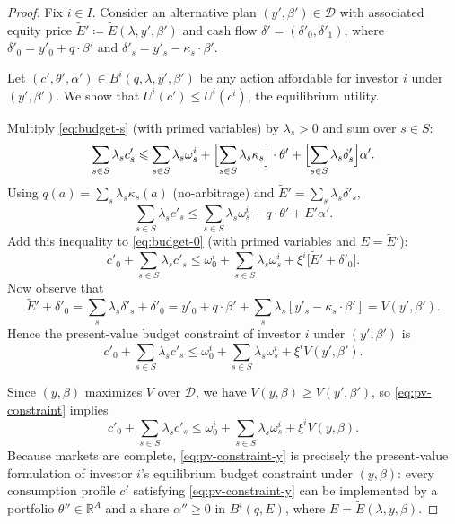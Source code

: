 \documentclass[11pt,a4paper,oneside]{book}
\def\R{\mathbb{R}}
\def\leq{\leqslant}
\def\geq{\geqslant}
\theoremstyle{plain}
\theoremstyle{definition}
\theoremstyle{remark}
\numberwithin{equation}{chapter}
\begin{document}
\begin{proof}
Fix $i \in I$.
Consider an alternative plan $(y', \beta') \in \mathcal{D}$ with associated equity price $\widetilde{E}' \coloneqq \widetilde{E}(\lambda, y', \beta')$ and cash flow $\delta' = (\delta'_0, \delta'_1)$, where $\delta'_0 = y'_0 + q \cdot \beta'$ and $\delta'_s = y'_s - \kappa_s \cdot \beta'$.

Let $(c', \theta', \alpha') \in B^i(q, \lambda, y', \beta')$ be any action affordable for investor $i$ under $(y', \beta')$.
We show that $U^i(c') \leq U^i(c^i)$, the equilibrium utility.

Multiply \eqref{eq:budget-s} (with primed variables) by $\lambda_s > 0$ and sum over $s \in S$:
\begin{equation*}
  \sum_{s \in S} \lambda_s c'_s
  \leq
  \sum_{s \in S} \lambda_s \omega^i_s
  + \Bigl[ \sum_{s \in S} \lambda_s \kappa_s \Bigr] \cdot \theta'
  + \Bigl[ \sum_{s \in S} \lambda_s \delta'_s \Bigr] \alpha'.
\end{equation*}
Using $q(a) = \sum_s \lambda_s \kappa_s(a)$ (no-arbitrage) and $\widetilde{E}' = \sum_s \lambda_s \delta'_s$,
\begin{equation*}
  \sum_{s \in S} \lambda_s c'_s
  \leq
  \sum_{s \in S} \lambda_s \omega^i_s
  + q \cdot \theta'
  + \widetilde{E}' \alpha'.
\end{equation*}
Add this inequality to \eqref{eq:budget-0} (with primed variables and $E = \widetilde{E}'$):
\begin{equation*}
  c'_0 + \sum_{s \in S} \lambda_s c'_s
  \leq
  \omega^i_0 + \sum_{s \in S} \lambda_s \omega^i_s
  + \xi^i \bigl[ \widetilde{E}' + \delta'_0 \bigr].
\end{equation*}
Now observe that
\begin{equation*}
  \widetilde{E}' + \delta'_0
  = \sum_s \lambda_s \delta'_s + \delta'_0
  = y'_0 + q \cdot \beta' + \sum_s \lambda_s [y'_s - \kappa_s \cdot \beta']
  = V(y', \beta').
\end{equation*}
Hence the present-value budget constraint of investor $i$ under $(y', \beta')$ is
\begin{equation}\label{eq:pv-constraint}
  c'_0 + \sum_{s \in S} \lambda_s c'_s
  \leq
  \omega^i_0 + \sum_{s \in S} \lambda_s \omega^i_s
  + \xi^i V(y', \beta').
\end{equation}

Since $(y, \beta)$ maximizes $V$ over $\mathcal{D}$, we have $V(y, \beta) \geq V(y', \beta')$, so \eqref{eq:pv-constraint} implies
\begin{equation}\label{eq:pv-constraint-y}
  c'_0 + \sum_{s \in S} \lambda_s c'_s
  \leq
  \omega^i_0 + \sum_{s \in S} \lambda_s \omega^i_s
  + \xi^i V(y, \beta).
\end{equation}
Because markets are complete, \eqref{eq:pv-constraint-y} is precisely the present-value formulation of investor $i$'s equilibrium budget constraint under $(y, \beta)$: every consumption profile $c'$ satisfying \eqref{eq:pv-constraint-y} can be implemented by a portfolio $\theta'' \in \R^A$ and a share $\alpha'' \geq 0$ in $B^i(q, E)$, where $E = \widetilde{E}(\lambda, y, \beta)$.


\end{proof}
\end{document}
